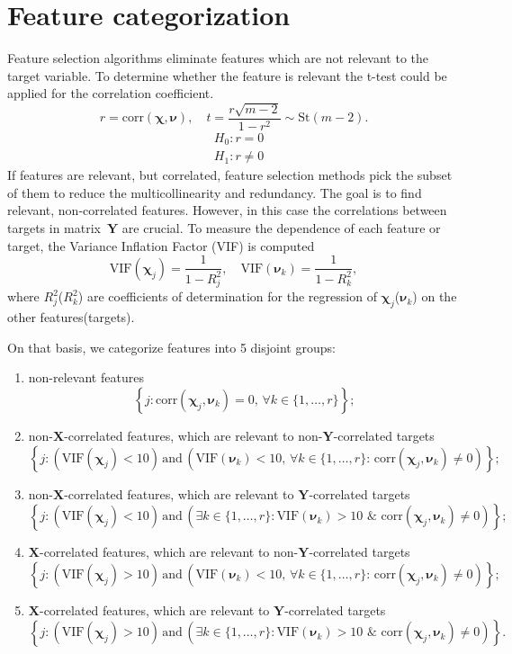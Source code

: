 \documentclass[12pt,twoside]{article}
\newcommand{\bY}{\mathbf{Y}}
\newcommand{\bX}{\mathbf{X}}
\newcommand{\bchi}{\boldsymbol{\chi}}
\newcommand{\bnu}{\boldsymbol{\nu}}
\begin{document}
\section{Feature categorization}
Feature selection algorithms eliminate features which are not relevant to the target variable.
To determine whether the feature is relevant the t-test could be applied for the correlation coefficient.
\[
	r = \text{corr} (\bchi, \bnu), \quad t = \frac{r \sqrt{m - 2}}{1 - r^2} \sim \text{St} (m - 2).
\]
\begin{align*}
&H_0: r = 0 \\
&H_1: r \neq 0
\end{align*}
If features are relevant, but correlated, feature selection methods pick the subset of them to reduce the multicollinearity and redundancy.
The goal is to find relevant, non-correlated features.
However, in this case the correlations between targets in matrix~$\bY$ are crucial.
To measure the dependence of each feature or target, the Variance Inflation Factor (VIF) is computed
\[
	\text{VIF}(\bchi_j) = \frac{1}{1 - R_j^2}, \quad \text{VIF}(\bnu_k) = \frac{1}{1 - R_k^2},
\]
where $R_j^2$($R_k^2$) are coefficients of determination for the regression of $\bchi_j$($\bnu_k$) on the other features(targets).

On that basis, we categorize features into 5 disjoint groups:
\begin{enumerate}
	\item non-relevant features
	\[
		\left\{j: \text{corr}(\bchi_j, \bnu_k) = 0, \, \forall k \in \{1, \dots, r\}\right\};
	\]
	\item non-$\bX$-correlated features, which are relevant to non-$\bY$-correlated targets
	\[
		\left\{j: \left(\text{VIF}(\bchi_j) < 10\right) \, \text{and} \, \left(\text{VIF}(\bnu_k) < 10 , \, \forall k \in \{1, \dots, r\}: \,  \text{corr}(\bchi_j, \bnu_k) \neq 0 \right)\right\};
	\]
	\item non-$\bX$-correlated features, which are relevant to $\bY$-correlated targets
	\[
		\left\{j: \left(\text{VIF}(\bchi_j) < 10\right) \, \text{and} \, \left( \exists k \in \{1, \dots, r\}: \text{VIF}(\bnu_k) > 10 \,\, \& \,\, \text{corr}(\bchi_j, \bnu_k) \neq 0 \right)\right\};
	\]
	\item $\bX$-correlated features, which are relevant to non-$\bY$-correlated targets
	\[
		\left\{j: \left(\text{VIF}(\bchi_j) > 10\right) \, \text{and} \, \left(\text{VIF}(\bnu_k) < 10 , \, \forall k \in \{1, \dots, r\}: \,  \text{corr}(\bchi_j, \bnu_k) \neq 0 \right)\right\};
	\]
	\item $\bX$-correlated features, which are relevant to $\bY$-correlated targets
	\[
		\left\{j: \left(\text{VIF}(\bchi_j) > 10\right) \, \text{and} \, \left( \exists k \in \{1, \dots, r\}: \text{VIF}(\bnu_k) > 10 \,\, \& \,\, \text{corr}(\bchi_j, \bnu_k) \neq 0 \right)\right\}.
	\]
\end{enumerate}
\end{document}
